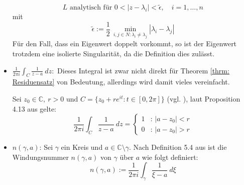 \documentclass[a4paper,12pt]{report}
\newcommand{\C}{\mathbb C}
\newcommand{\1}{\mathds{1}}
\theoremstyle{plain} %
\theoremstyle{definition} %
\theoremstyle{remark}
\begin{document}
\begin{itemize}
                        \begin{equation}
                              \label{hilfe: complexAnalysis_isolierteSingularitäten}
                              L \text{ analytisch für } 0<|z-\lambda_i|<\widetilde{\epsilon},\quad i=1,\dots,n
                        \end{equation}
                        mit
                        $$\widetilde{\epsilon}:= \frac{1}{2}\,\min_{i,j\in N: \lambda_i\ne \lambda_j} |\lambda_i-\lambda_j|$$
                        Für den Fall, dass ein Eigenwert doppelt vorkommt, so ist der Eigenwert trotzdem eine isolierte Singularität, da die Definition dies zulässt.
                  \item $\frac{1}{2\pi i}\int_{C} \frac 1 {z-a}\ dz:$
                        Dieses Integral ist zwar nicht direkt für Theorem \ref{thrm: Residuensatz} von Bedeutung, allerdings wird damit vieles vereinfacht.

                        Sei $z_0\in\C,\ r>0\text{ und }C=\{z_0+r e^{it}: t\in [0,2\pi]\}$ (vgl. \cite[S. 48]{complexAnalysis}), laut Proposition 4.13 aus \cite[S. 48]{complexAnalysis} gelte:
                        \begin{equation}
                              \label{hilfe: complexAnalysis_IntegralEinsDurchX}
                              \frac{1}{2\pi i}\int_C \frac 1 {z-a}\ dz = \begin{cases}
                                    1 & \text{: } |a-z_0|<r \\
                                    0 & \text{: } |a-z_0|>r
                                    \end{cases}
                        \end{equation}
                  \item $n(\gamma, a)$:
                        Sei $\gamma$ ein Kreis und $a\in \C\setminus \gamma$.
                        Nach Definition 5.4 aus \cite[S. 65]{complexAnalysis} ist die Windungsnummer $n(\gamma,a)$ von $\gamma$ über $a$ wie folgt definiert:
                        $$n(\gamma,a):= \frac{1}{2\pi i}\int_\gamma \frac{1}{\xi-a}\ d\xi$$


\end{itemize}
\end{document}
